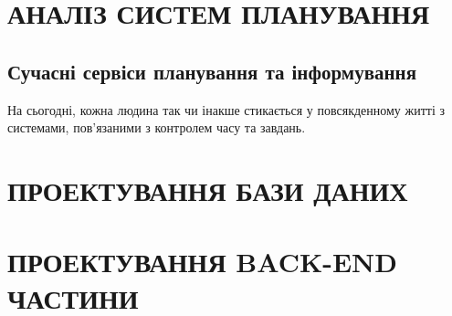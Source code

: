 \documentclass[a4paper,14pt]{extarticle} %
\begin{document}

\tableofcontents %
\clearpage


\section{АНАЛІЗ СИСТЕМ ПЛАНУВАННЯ}

\subsection{Сучасні сервіси планування та інформування}

На сьогодні, кожна людина так чи інакше стикається у повсякденному житті з системами, пов'язаними з контролем часу та завдань.






\section{ПРОЕКТУВАННЯ БАЗИ ДАНИХ}






\section{ПРОЕКТУВАННЯ BACK-END ЧАСТИНИ}














\end{document}
